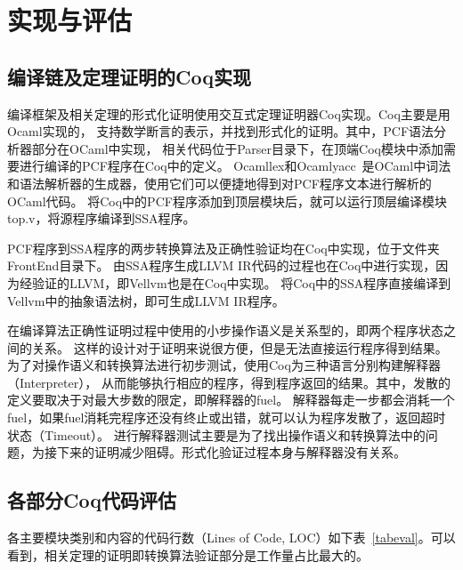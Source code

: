 
\chapter{实现与评估} \label{ch:implement}

\section{编译链及定理证明的Coq实现}

编译框架及相关定理的形式化证明使用交互式定理证明器Coq实现。Coq主要是用Ocaml实现的，
支持数学断言的表示，并找到形式化的证明。其中，PCF语法分析器部分在OCaml中实现，
相关代码位于Parser目录下，在顶端Coq模块中添加需要进行编译的PCF程序在Coq中的定义。
Ocamllex和Ocamlyacc~\cite{smith2007ocamllex}是OCaml中词法和语法解析器的生成器，使用它们可以便捷地得到对PCF程序文本进行解析的OCaml代码。
将Coq中的PCF程序添加到顶层模块后，就可以运行顶层编译模块top.v，将源程序编译到SSA程序。

PCF程序到SSA程序的两步转换算法及正确性验证均在Coq中实现，位于文件夹FrontEnd目录下。
由SSA程序生成LLVM IR代码的过程也在Coq中进行实现，因为经验证的LLVM，即Vellvm也是在Coq中实现。
将Coq中的SSA程序直接编译到Vellvm中的抽象语法树，即可生成LLVM IR程序。

在编译算法正确性证明过程中使用的小步操作语义是关系型的，即两个程序状态之间的关系。
这样的设计对于证明来说很方便，但是无法直接运行程序得到结果。
为了对操作语义和转换算法进行初步测试，使用Coq为三种语言分别构建解释器（Interpreter），
从而能够执行相应的程序，得到程序返回的结果。其中，发散的定义要取决于对最大步数的限定，即解释器的fuel。
解释器每走一步都会消耗一个fuel，如果fuel消耗完程序还没有终止或出错，就可以认为程序发散了，返回超时状态（Timeout）。
进行解释器测试主要是为了找出操作语义和转换算法中的问题，为接下来的证明减少阻碍。形式化验证过程本身与解释器没有关系。

\section{各部分Coq代码评估}

各主要模块类别和内容的代码行数（Lines of Code, LOC）如下表~\ref{tabeval}。可以看到，相关定理的证明即转换算法验证部分是工作量占比最大的。

